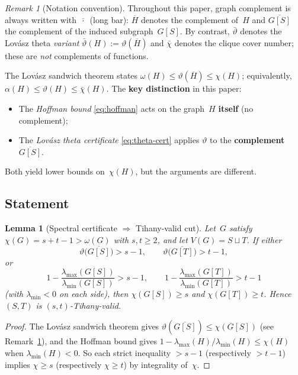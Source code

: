 \documentclass[11pt,a4paper]{amsart}
\theoremstyle{plain}
\newtheorem{lemma}[theorem]{Lemma}
\theoremstyle{definition}
\theoremstyle{remark}
\newtheorem{remark}[theorem]{Remark}
\newcommand{\chr}{\chi}
\newcommand{\om}{\omega}
\begin{document}
\begin{remark}[Notation convention]\label{rem:theta-notation}
Throughout this paper, graph complement is always written with
$\overline{\,\cdot\,}$ (long bar): $\overline{H}$ denotes the complement
of~$H$ and $\overline{G[S]}$ the complement of the induced subgraph~$G[S]$.
By contrast, $\bar{\vartheta}$ denotes the Lov\'asz theta \emph{variant}
$\bar{\vartheta}(H) := \vartheta(\overline{H})$ and $\bar{\chr}$ denotes the
clique cover number; these are \emph{not} complements of functions.

The Lov\'asz sandwich theorem states
$\om(H) \leq \vartheta(\overline{H}) \leq \chr(H)$; equivalently,
$\alpha(H) \leq \vartheta(H) \leq \bar{\chr}(H)$.
The \textbf{key distinction} in this paper:
\begin{itemize}
\item The \emph{Hoffman bound} \eqref{eq:hoffman} acts on the graph~$H$
  \textbf{itself} (no complement);
\item The \emph{Lov\'asz theta certificate} \eqref{eq:theta-cert} applies
  $\vartheta$ to the \textbf{complement} $\overline{G[S]}$.
\end{itemize}
Both yield lower bounds on~$\chr(H)$, but the arguments are different.
\end{remark}

\subsection{Statement}

\begin{lemma}[Spectral certificate $\Rightarrow$ Tihany-valid cut]
\label{lem:spectral-certificate}
Let~$G$ satisfy $\chr(G) = s+t-1 > \om(G)$ with $s,t\geq 2$, and let
$V(G) = S\sqcup T$.  If either
\begin{equation}\label{eq:theta-cert}
  \vartheta\bigl(\overline{G[S]}\bigr) > s-1,
  \qquad
  \vartheta\bigl(\overline{G[T]}\bigr) > t-1,
\end{equation}
or
\begin{equation}\label{eq:hoffman-cert}
  1 - \frac{\lambda_{\max}(G[S])}{\lambda_{\min}(G[S])} > s-1,
  \qquad
  1 - \frac{\lambda_{\max}(G[T])}{\lambda_{\min}(G[T])} > t-1
\end{equation}
(with $\lambda_{\min}<0$ on each side), then
$\chr(G[S]) \geq s$ and $\chr(G[T]) \geq t$.
Hence $(S,T)$ is $(s,t)$-Tihany-valid.
\end{lemma}

\begin{proof}
The Lov\'asz sandwich theorem gives
$\vartheta(\overline{G[S]}) \leq \chr(G[S])$ (see Remark~\ref{rem:theta-notation}),
and the Hoffman bound gives
$1 - \lambda_{\max}(H)/\lambda_{\min}(H) \leq \chr(H)$ when
$\lambda_{\min}(H) < 0$.  So each strict inequality $> s-1$ (respectively
$> t-1$) implies $\chr \geq s$ (respectively $\chr \geq t$) by integrality
of~$\chr$.
\end{proof}
\end{document}
